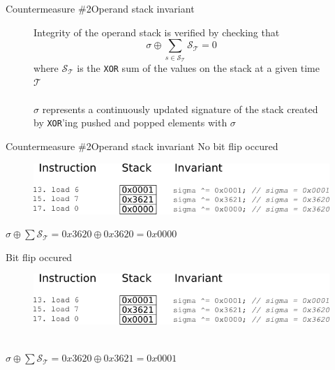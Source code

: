 
\begin{frame}[fragile]{Countermeasure \#2}{Operand stack invariant}
\begin{figure}
Integrity of the operand stack is verified by checking that $$\sigma \oplus \sum_{s \in \mathcal{S}_{\mathcal{T}}} \mathcal{S}_{\mathcal{T}} = 0$$ where $\mathcal{S}_{\mathcal{T}}$ is the \texttt{XOR} sum of the values on the stack at a given time $\mathcal{T}$\\~\\
$\sigma$ represents a continuously updated signature of the stack created by \texttt{XOR}'ing pushed and popped elements with $\sigma$
\end{figure}
\end{frame}

\begin{frame}[fragile]{Countermeasure \#2}{Operand stack invariant}
No bit flip occured
\begin{figure}
\includegraphics[scale=0.5]{figures/stackinvariantModified1.png}
\end{figure}
\begin{center}

$\sigma \oplus  \sum\mathcal{S}_\mathcal{T} = 0x3620 \oplus 0x3620 = 0x0000$ 
\end{center}
Bit flip occured
\begin{figure}
\includegraphics[scale=0.5]{figures/stackinvariantModified.png}\\~\\
\end{figure}
\begin{center}
$\sigma \oplus  \sum\mathcal{S}_\mathcal{T} = 0x3620 \oplus 0x3621 = 0x0001$ 
\end{center}
\end{frame}